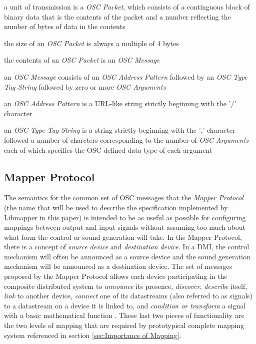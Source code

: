 \begin{description}
\item a unit of transmission is a \emph{OSC Packet}, which consists of a continguous block of binary data that is the contents of the packet and a number reflecting the number of bytes of data in the contents
\item the size of an \emph{OSC Packet} is always a multiple of 4 bytes
\item the contents of an \emph{OSC Packet} is an \emph{OSC Message}
\item an \emph{OSC Message} consists of an \emph{OSC Address Pattern} followed by an \emph{OSC Type Tag String} followed by zero or more \emph{OSC Arguments}
\item an \emph{OSC Address Pattern} is a URL-like string strictly beginning with the '/' character
\item an \emph{OSC Type Tag String} is a string strictly beginning with the ',' character followed a number of charcters corresponding to the number of \emph{OSC Arguments} each of which specifies the OSC defined data type of each argument
\end{description}

\subsection{Mapper Protocol}

The semantics for the common set of OSC messages that the \emph{Mapper Protocol} (the name that will be used to describe the specification implemented by Libmapper in this paper) is intended to be as useful as possible for configuring mappings between output and input signals without assuming too much about what form the control or sound generation will take. In the Mapper Protocol, there is a concept of \emph{source device} and \emph{destination device}. In a DMI, the control mechanism will often be announced as a source device and the sound generation mechanism will be announced as a destination device. The set of messages proposed by the Mapper Protocol allows each device participating in the composite distributed system to \emph{announce} its presence, \emph{discover}, \emph{describe} itself, \emph{link} to another device, \emph{connect} one of its datastreams (also referred to as signals) to a datastream on a device it is linked to, and \emph{condition or transform} a signal with a basic mathematical function \cite{Malloch2009}. These last two pieces of functionality are the two levels of mapping that are required by prototypical complete mapping system referenced in section \ref{sec:Importance of Mapping}.

